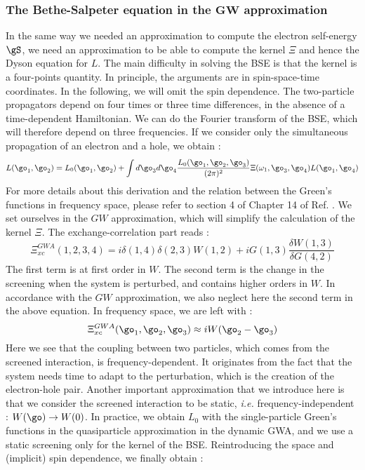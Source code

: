\subsubsection{The Bethe-Salpeter equation in the $\mathbf{GW}$ approximation}
In the same way we needed an approximation to compute the electron self-energy $\gS$, we need an approximation to be able to compute the kernel $\Xi$ and hence the Dyson equation for $L$. The main difficulty in solving the \acrshort{BSE} is that the kernel is a four-points quantity. In principle, the arguments are in spin-space-time coordinates. In the following, we will omit the spin dependence. The two-particle propagators depend on four times or three time differences, in the absence of a time-dependent Hamiltonian. We can do the Fourier transform of the BSE, which will therefore depend on three frequencies. If we consider only the simultaneous propagation of an electron and a hole, we obtain :
\begin{equation}
	L(\go_1,\go_2) = L_0(\go_1,\go_2) + \int d\go_3 d\go_4 \frac{L_0(\go_1,\go_2,\go_3)}{(2\pi)^2} \Xi(\omega_1,\go_3,\go_4) L(\go_1,\go_4) \label{eq:BSE_freq}
\end{equation}
For more details about this derivation and the relation between the Green's functions in frequency space, please refer to section 4 of Chapter 14 of Ref. \cite{martin2016interacting}. We set ourselves in the $GW$ approximation, which will simplify the calculation of the kernel $\Xi$. The exchange-correlation part reads :
\begin{equation}
	\Xi^{GWA}_{xc}(1,2,3,4) = i\delta(1,4)\delta(2,3)W(1,2) + iG(1,3)\frac{\delta W(1,3)}{\delta G(4,2)}
\end{equation}
The first term is at first order in $W$. The second term is the change in the screening when the system is perturbed, and contains higher orders in $W$. In accordance with the $GW$ approximation, we also neglect here the second term in the above equation. In frequency space, we are left with :
\begin{equation}
	\Xi^{GWA}_{xc}(\go_1,\go_2,\go_3) \approx iW(\go_2 - \go_3)
\end{equation}
Here we see that the coupling between two particles, which comes from the screened interaction, is frequency-dependent. It originates from the fact that the system needs time to adapt to the perturbation, which is the creation of the electron-hole pair. Another important approximation that we introduce here is that we consider the screened interaction to be static, \textit{i.e.} frequency-independent : $W(\go) \to W(0)$. In practice, we obtain $L_0$ with the single-particle Green's functions in the quasiparticle approximation in the dynamic \acrfull{GWA}, and we use a static screening only for the kernel of the \acrshort{BSE}. Reintroducing the space and (implicit) spin dependence, we finally obtain :

